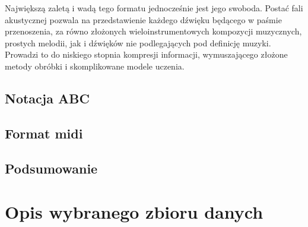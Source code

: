 {{{            Największą zaletą i wadą tego formatu jednocześnie jest jego swoboda. 
            Postać fali akustycznej pozwala na przedstawienie każdego dźwięku będącego w paśmie
            przenoszenia, za równo złożonych wieloinstrumentowych kompozycji muzycznych, 
            prostych melodii, jak i dźwięków nie podlegających pod definicję muzyki. 
            Prowadzi to do niskiego stopnia kompresji informacji, wymuszającego złożone metody obróbki i skomplikowane
            modele uczenia.

        }

        \subsection{Notacja ABC}
        {
            
        }

        \subsection{Format midi}
        {
            
        }

        \subsection{Podsumowanie}
        {
            
        }
    }

    \section{Opis wybranego zbioru danych}
    {

    }
}